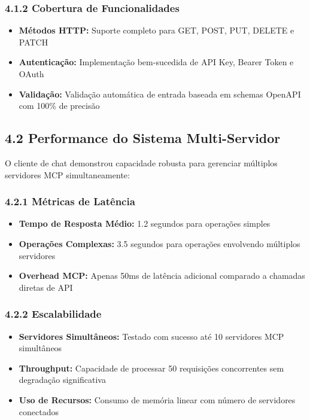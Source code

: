 \documentclass[
]{article}
\providecommand{\tightlist}{%
  \setlength{\itemsep}{0pt}\setlength{\parskip}{0pt}}
\begin{document}
\subsubsection{4.1.2 Cobertura de
Funcionalidades}\label{cobertura-de-funcionalidades}

\begin{itemize}
\tightlist
\item
  \textbf{Métodos HTTP:} Suporte completo para GET, POST, PUT, DELETE e
  PATCH
\item
  \textbf{Autenticação:} Implementação bem-sucedida de API Key, Bearer
  Token e OAuth
\item
  \textbf{Validação:} Validação automática de entrada baseada em schemas
  OpenAPI com 100\% de precisão
\end{itemize}

\subsection{4.2 Performance do Sistema
Multi-Servidor}\label{performance-do-sistema-multi-servidor}

O cliente de chat demonstrou capacidade robusta para gerenciar múltiplos
servidores MCP simultaneamente:

\subsubsection{4.2.1 Métricas de
Latência}\label{muxe9tricas-de-latuxeancia}

\begin{itemize}
\tightlist
\item
  \textbf{Tempo de Resposta Médio:} 1.2 segundos para operações simples
\item
  \textbf{Operações Complexas:} 3.5 segundos para operações envolvendo
  múltiplos servidores
\item
  \textbf{Overhead MCP:} Apenas 50ms de latência adicional comparado a
  chamadas diretas de API
\end{itemize}

\subsubsection{4.2.2 Escalabilidade}\label{escalabilidade}

\begin{itemize}
\tightlist
\item
  \textbf{Servidores Simultâneos:} Testado com sucesso até 10 servidores
  MCP simultâneos
\item
  \textbf{Throughput:} Capacidade de processar 50 requisições
  concorrentes sem degradação significativa
\item
  \textbf{Uso de Recursos:} Consumo de memória linear com número de
  servidores conectados
\end{itemize}
\end{document}
